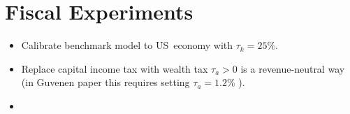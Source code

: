 \documentclass[12pt]{article}
\begin{document}
\bigskip 

\section{Fiscal Experiments}

\bigskip 

\begin{itemize}
\item Calibrate benchmark model to US\ economy with $\tau _{k}=25\%$.

\item Replace capital income tax with wealth tax $\tau _{a}>0$ is a
revenue-neutral way (in Guvenen paper this requires setting $\tau _{a}=1.2\%$%
).

\item 
\end{itemize}
\end{document}
